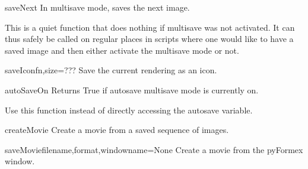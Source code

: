 \begin{funcdesc}{saveNext}{}
In multisave mode, saves the next image.

    This is a quiet function that does nothing if multisave was not activated.
    It can thus safely be called on regular places in scripts where one would
    like to have a saved image and then either activate the multisave mode
    or not.
    

\end{funcdesc}


\begin{funcdesc}{saveIcon}{fn,size=???}
Save the current rendering as an icon.

\end{funcdesc}


\begin{funcdesc}{autoSaveOn}{}
Returns True if autosave multisave mode is currently on.

    Use this function instead of directly accessing the autosave variable.
    

\end{funcdesc}


\begin{funcdesc}{createMovie}{}
Create a movie from a saved sequence of images.

\end{funcdesc}


\begin{funcdesc}{saveMovie}{filename,format,windowname=None}
Create a movie from the pyFormex window.

\end{funcdesc}



